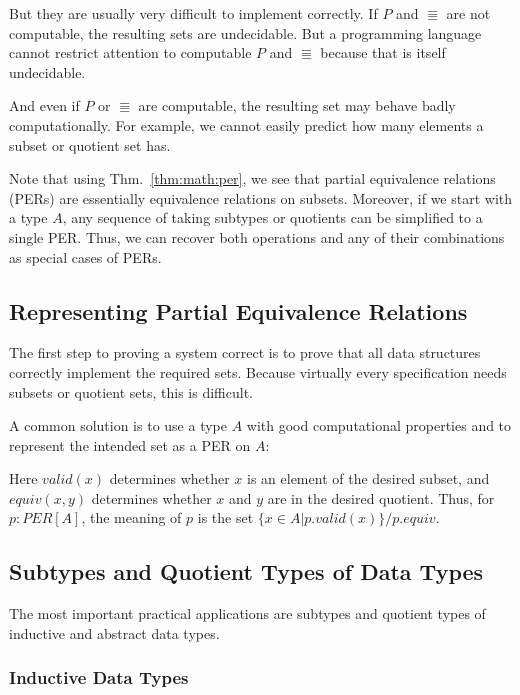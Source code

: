 But they are usually very difficult to implement correctly.
If $P$ and $\Equiv$ are not computable, the resulting sets are undecidable.
But a programming language cannot restrict attention to computable $P$ and $\Equiv$ because that is itself undecidable.

And even if $P$ or $\Equiv$ are computable, the resulting set may behave badly computationally.
For example, we cannot easily predict how many elements a subset or quotient set has.

Note that using Thm.~\ref{thm:math:per}, we see that partial equivalence relations (PERs) are essentially equivalence relations on subsets.
Moreover, if we start with a type $A$, any sequence of taking subtypes or quotients can be simplified to a single PER.
Thus, we can recover both operations and any of their combinations as special cases of PERs.

\subsection{Representing Partial Equivalence Relations}

The first step to proving a system correct is to prove that all data structures correctly implement the required sets.
Because virtually every specification needs subsets or quotient sets, this is difficult.

A common solution is to use a type $A$ with good computational properties and to represent the intended set as a PER on $A$:
\begin{acode}
\end{acode}
Here $valid(x)$ determines whether $x$ is an element of the desired subset, and $equiv(x,y)$ determines whether $x$ and $y$ are in the desired quotient.
Thus, for $p:PER[A]$, the meaning of $p$ is the set $\{x\in A|p.valid(x)\}/p.equiv$.

\subsection{Subtypes and Quotient Types of Data Types}

The most important practical applications are subtypes and quotient types of inductive and abstract data types.

\subsubsection{Inductive Data Types}

